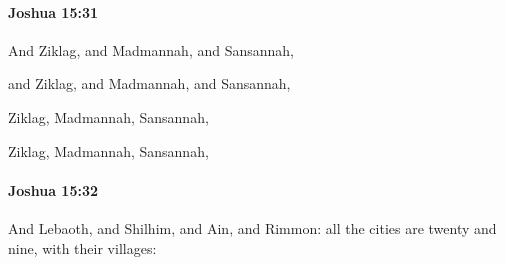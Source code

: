 		\paragraph{Joshua 15:31} %
			\label{JOSHUA-15-31}

			And Ziklag, and Madmannah, and Sansannah,

			\begin{versebox}
					\item[BHS] 
					\item[ASV] and Ziklag, and Madmannah, and Sansannah,
					\item[NIV] Ziklag, Madmannah, Sansannah,
					\item[NRSV] Ziklag, Madmannah, Sansannah,
			\end{versebox}

		\paragraph{Joshua 15:32} %
			\label{JOSHUA-15-32}

			And Lebaoth, and Shilhim, and Ain, and Rimmon: all the cities are twenty and nine, with their villages:

